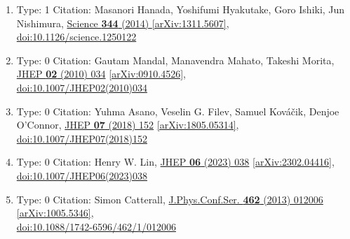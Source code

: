 \documentclass[a4paper,10pt]{article}
\begin{document}
\begin{enumerate}
\begin{enumerate}
  \item Type: 1 Citation: Masanori Hanada, Yoshifumi Hyakutake, Goro Ishiki, Jun Nishimura, \href{https://www.doi.org/10.1126/science.1250122}{Science {\bf 344} (2014) }  \href{https://arxiv.org/abs/1311.5607}{[arXiv:1311.5607]},\\\href{https://www.doi.org/10.1126/science.1250122}{doi:10.1126/science.1250122}
  \item Type: 0 Citation: Gautam Mandal, Manavendra Mahato, Takeshi Morita, \href{https://www.doi.org/10.1007/JHEP02(2010)034}{JHEP {\bf 02} (2010) 034}  \href{https://arxiv.org/abs/0910.4526}{[arXiv:0910.4526]},\\\href{https://www.doi.org/10.1007/JHEP02(2010)034}{doi:10.1007/JHEP02(2010)034}
  \item Type: 0 Citation: Yuhma Asano, Veselin G. Filev, Samuel Kováčik, Denjoe O'Connor, \href{https://www.doi.org/10.1007/JHEP07(2018)152}{JHEP {\bf 07} (2018) 152}  \href{https://arxiv.org/abs/1805.05314}{[arXiv:1805.05314]},\\\href{https://www.doi.org/10.1007/JHEP07(2018)152}{doi:10.1007/JHEP07(2018)152}
  \item Type: 0 Citation: Henry W. Lin, \href{https://www.doi.org/10.1007/JHEP06(2023)038}{JHEP {\bf 06} (2023) 038}  \href{https://arxiv.org/abs/2302.04416}{[arXiv:2302.04416]},\\\href{https://www.doi.org/10.1007/JHEP06(2023)038}{doi:10.1007/JHEP06(2023)038}
  \item Type: 0 Citation: Simon Catterall, \href{https://www.doi.org/10.1088/1742-6596/462/1/012006}{J.Phys.Conf.Ser. {\bf 462} (2013) 012006}  \href{https://arxiv.org/abs/1005.5346}{[arXiv:1005.5346]},\\\href{https://www.doi.org/10.1088/1742-6596/462/1/012006}{doi:10.1088/1742-6596/462/1/012006}

\end{enumerate}
\end{enumerate}
\end{document}

